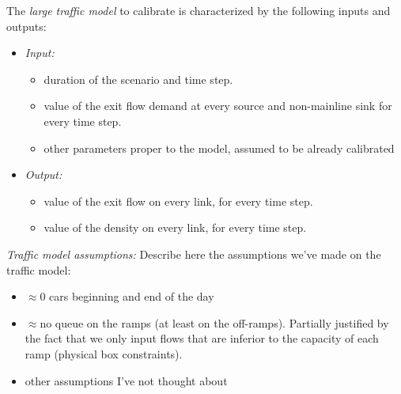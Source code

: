 The \emph{large traffic model} to calibrate is characterized by the following inputs and outputs:
\begin{itemize}
	\item \emph{Input:} 
	\begin{itemize}
		\item   duration of the scenario and time step.
		\item   value of the exit flow demand at every source and non-mainline sink for every time step.\color{red}
		\item	other parameters proper to the model, assumed to be already calibrated
	\end{itemize}
	\item \emph{Output:}
	\begin{itemize}
		\item   value of the exit flow on every link, for every time step.
		\item	value of the density on every link, for every time step.		
	\end{itemize}
\end{itemize}
\emph{Traffic model assumptions:} \color{red}Describe here the assumptions we've made on the traffic model:\color{black}
\begin{itemize}
	\item $\approx 0$ cars beginning and end of the day
	\item $\approx$no queue on the ramps (at least on the off-ramps). Partially justified by the fact that we only input flows that are inferior to the capacity of each ramp (physical box constraints).
	\item other assumptions I've not thought about
\end{itemize}
